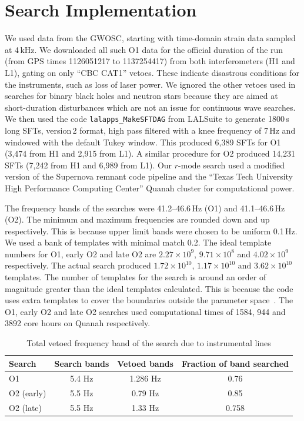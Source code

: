 \documentclass{ttuthes2007}
\begin{document}
\section{Search Implementation} 
We used data from the \ac{GWOSC}, starting with time-domain strain data sampled
at 4\,kHz.  We downloaded all such \ac{O1} data for the official duration of the
run (from GPS times 1126051217 to 1137254417) from both interferometers (H1 and
L1), gating on only ``CBC CAT1'' vetoes. These indicate disastrous conditions
for the instruments, such as loss of laser power. We ignored the other vetoes
used in searches for binary black holes and neutron stars because they are aimed
at short-duration disturbances which are not an issue for continuous wave
searches.  We then used the code \texttt{lalapps\_MakeSFTDAG} from LALSuite to
generate 1800\,s long \acp{SFT}, version\,2 format, high pass filtered with a knee
frequency of 7\,Hz and windowed with the default Tukey window. This produced
6,389 \acp{SFT} for \ac{O1} (3,474 from H1 and 2,915 from L1). A similar
procedure for \ac{O2} produced 14,231 \acp{SFT} (7,242 from H1 and 6,989 from
L1). Our $r$-mode search used a modified version of the Supernova remnant
code pipeline\cite{Aasi_2015} and the ``Texas Tech University High Performance Computing
Center'' Quanah cluster for computational power.

The frequency bands of the searches were 41.2--46.6\,Hz (O1) and 41.1--46.6\,Hz (O2).
The minimum and maximum frequencies are rounded down and up respectively. 
This is because upper limit bands were chosen to be uniform  0.1\,Hz. We used a
bank of templates with minimal match 0.2. The ideal
template numbers for O1, early O2 and late O2 are $2.27\times 10^9$,
$9.71\times 10^8$ and $4.02\times 10^9$ respectively. The actual search produced
$1.72\times 10^{10}$, $1.17\times 10^{10}$ and $3.62 \times 10^{10}$ templates.
The number of templates for the search is around an order of magnitude greater than
the ideal templates calculated. This is because the code uses extra templates
to cover the boundaries outside the parameter space~\cite{Abadie_2010}. The
O1, early O2 and late O2 searches used computational times of 1584, 944 and 3892 core
hours on Quanah respectively.

\begin{table} 
\centering
\begin{tabular}{lccc} 
\hline
\hline
\textrm{Search} & \textrm{Search bands} & \textrm{Vetoed bands} &
\textrm{Fraction of band searched}\\[5pt]   
\hline
\ac{O1} & 5.4 Hz & 1.286 Hz & 0.76\\[5pt] 
\ac{O2} (early)& 5.5 Hz  & 0.79 Hz & 0.85\\[5pt] 
\ac{O2} (late) & 5.5 Hz & 1.33 Hz & 0.758\\  
\hline
\hline
\end{tabular} 
\caption{Total vetoed frequency band of the search due to instrumental
lines}\label{table:veto} 
\end{table} 
\end{document}
